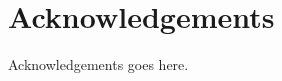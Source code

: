 \chapter*{\centering Acknowledgements}
\begin{spacing}{1.5}
\setlength{\parskip}{0.3in}
\thispagestyle{addin}

Acknowledgements goes here.

\end{spacing}
\newpage
